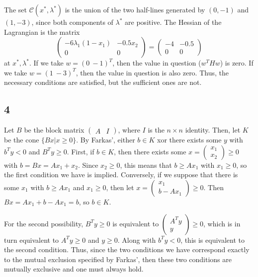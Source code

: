 \documentclass{article}
\newcommand{\openm}{\begin{pmatrix}}
\newcommand{\closem}{\end{pmatrix}}
\begin{document}
The set $\mathscr{C}(x^*, \lambda^*)$ is the union of the two half-lines generated by $(0, -1)$ and $(1, -3)$, since both components of $\lambda^*$ are positive.
The Hessian of the Lagrangian is the matrix
\[\openm -6\lambda_1(1-x_1)&-0.5x_2\\0&0\closem=\openm-4&-0.5\\0&0\closem\]
at $x^*, \lambda^*$. 
If we take $w=(0\ -1)^T$, then the value in question ($w^THw$) is zero. If we take $w=(1\ -3)^T$, then the value in question is also zero. Thus, the necessary conditions are satisfied, but the sufficient ones are not.
\subsection*{4}
Let $B$ be the block matrix $\openm A&I\closem$, where $I$ is the $n\times n$ identity. Then, let $K$ be the cone $\{Bx|x\geq0\}$. By Farkas', either $b\in K$ xor there exists some $y$ with $b^Ty<0$ and $B^Ty\geq0$. First, if $b\in K$, then there exists some $x=\openm x_1\\x_2\closem\geq0$ with $b=Bx=Ax_1+x_2$. Since $x_2\geq0$, this means that $b\geq Ax_1$ with $x_1\geq0$, so the first condition we have is implied. Conversely, if we suppose that there is some $x_1$ with $b\geq Ax_1$ and $x_1\geq0$, then let $x=\openm x_1\\b-Ax_1\closem\geq0$. Then $Bx=Ax_1+b-Ax_1=b$, so $b\in K$. 

For the second possibility, $B^Ty\geq0$ is equivalent to $\openm A^Ty\\y\closem\geq0$, which is in turn equivalent to $A^Ty\geq0$ and $y\geq0$. Along with $b^Ty<0$, this is equivalent to the second condition. Thus, since the two conditions we have correspond exactly to the mutual exclusion specified by Farkas', then these two conditions are mutually exclusive and one must always hold.
\end{document}
